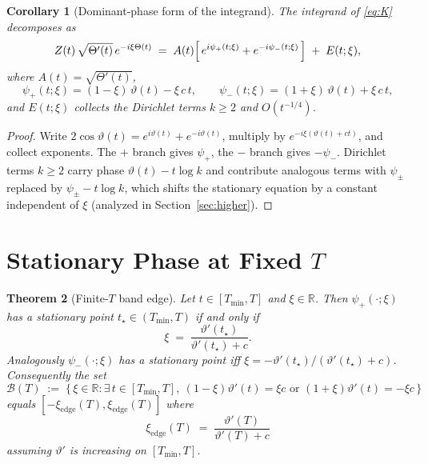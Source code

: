 \documentclass[11pt,a4paper]{article}
\theoremstyle{plain}
\newtheorem{theorem}{Theorem}
\newtheorem{corollary}[theorem]{Corollary}
\theoremstyle{definition}
\newcommand{\R}{\mathbb{R}}
\begin{document}
\begin{corollary}[Dominant-phase form of the integrand]\label{cor:phases}
The integrand of \eqref{eq:K} decomposes as
\begin{equation}\label{eq:two-phases}
Z(t)\,\sqrt{\Theta'(t)}\,e^{-i\xi\Theta(t)}
\;=\; A(t)\Bigl[\,e^{i\psi_{+}(t;\xi)} + e^{-i\psi_{-}(t;\xi)}\,\Bigr] \;+\; E(t;\xi),
\end{equation}
where $A(t)=\sqrt{\Theta'(t)}$,
\begin{equation}\label{eq:psipm}
\psi_{+}(t;\xi)=(1-\xi)\,\vartheta(t)-\xi\,c\,t,\qquad
\psi_{-}(t;\xi)=(1+\xi)\,\vartheta(t)+\xi\,c\,t,
\end{equation}
and $E(t;\xi)$ collects the Dirichlet terms $k\ge 2$ and $O(t^{-1/4})$.
\end{corollary}

\begin{proof}
Write $2\cos\vartheta(t)=e^{i\vartheta(t)}+e^{-i\vartheta(t)}$, multiply by $e^{-i\xi(\vartheta(t)+ct)}$, and collect exponents. The $+$ branch gives $\psi_+$, the $-$ branch gives $-\psi_-$. Dirichlet terms $k\ge 2$ carry phase $\vartheta(t)-t\log k$ and contribute analogous terms with $\psi_\pm$ replaced by $\psi_\pm - t\log k$, which shifts the stationary equation by a constant independent of $\xi$ (analyzed in Section~\ref{sec:higher}).
\end{proof}

\section{Stationary Phase at Fixed $T$}

\begin{theorem}[Finite-$T$ band edge]\label{thm:edge}
Let $t\in[T_{\min},T]$ and $\xi\in\R$. Then $\psi_{+}(\cdot;\xi)$ has a stationary point $t_\star\in(T_{\min},T)$ if and only if
\begin{equation}\label{eq:stat+}
\xi \;=\; \frac{\vartheta'(t_\star)}{\vartheta'(t_\star)+c} .
\end{equation}
Analogously $\psi_{-}(\cdot;\xi)$ has a stationary point iff $\xi=-\vartheta'(t_\star)/(\vartheta'(t_\star)+c)$. Consequently the set
\[
\mathcal{B}(T) \;:=\; \bigl\{\,\xi\in\R : \exists\,t\in[T_{\min},T],\ (1-\xi)\vartheta'(t)=\xi c \text{ or } (1+\xi)\vartheta'(t)=-\xi c\,\bigr\}
\]
equals $[-\xi_{\mathrm{edge}}(T),\xi_{\mathrm{edge}}(T)]$ where
\begin{equation}\label{eq:edge}
\boxed{\;\xi_{\mathrm{edge}}(T) \;=\; \frac{\vartheta'(T)}{\vartheta'(T)+c}\;}
\end{equation}
assuming $\vartheta'$ is increasing on $[T_{\min},T]$.
\end{theorem}
\end{document}

